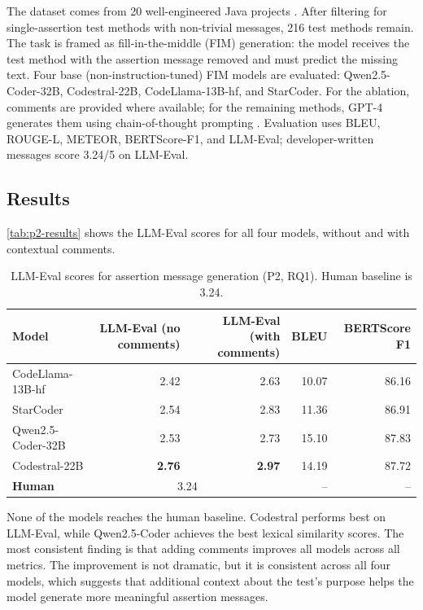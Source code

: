\documentclass[
    pdftex,
    final,
    11pt,
    a4paper,
    parskip=false,
    oneside,
    footheight=0mm,
    footinclude=false,
    toc=bibliography
]{scrbook}
\begin{document}
The dataset comes from 20 well-engineered Java projects \cite{Takebayashi2023}. After filtering for single-assertion test methods with non-trivial messages, 216 test methods remain. The task is framed as fill-in-the-middle (FIM) generation: the model receives the test method with the assertion message removed and must predict the missing text. Four base (non-instruction-tuned) FIM models are evaluated: Qwen2.5-Coder-32B, Codestral-22B, CodeLlama-13B-hf, and StarCoder. For the ablation, comments are provided where available; for the remaining methods, GPT-4 generates them using chain-of-thought prompting \cite{Sun2023}. Evaluation uses BLEU, ROUGE-L, METEOR, BERTScore-F1, and LLM-Eval; developer-written messages score 3.24/5 on LLM-Eval.

\subsection{Results}

\autoref{tab:p2-results} shows the LLM-Eval scores for all four models, without and with contextual comments.

\begin{table}[htbp]
\centering
\caption{LLM-Eval scores for assertion message generation (P2, RQ1). Human baseline is 3.24.}
\label{tab:p2-results}
\small
\begin{tabularx}{\linewidth}{lrrrr}
\toprule
\textbf{Model} & \textbf{LLM-Eval (no comments)} & \textbf{LLM-Eval (with comments)} & \textbf{BLEU} & \textbf{BERTScore F1} \\
\midrule
CodeLlama-13B-hf   & 2.42 & 2.63 & 10.07 & 86.16 \\
StarCoder          & 2.54 & 2.83 & 11.36 & 86.91 \\
Qwen2.5-Coder-32B  & 2.53 & 2.73 & 15.10 & 87.83 \\
Codestral-22B      & \textbf{2.76} & \textbf{2.97} & 14.19 & 87.72 \\
\midrule
\textbf{Human}     & \multicolumn{2}{c}{3.24} & -- & -- \\
\bottomrule
\end{tabularx}
\end{table}

None of the models reaches the human baseline. Codestral performs best on LLM-Eval, while Qwen2.5-Coder achieves the best lexical similarity scores. The most consistent finding is that adding comments improves all models across all metrics. The improvement is not dramatic, but it is consistent across all four models, which suggests that additional context about the test's purpose helps the model generate more meaningful assertion messages.
\end{document}
